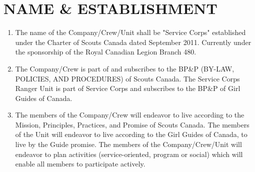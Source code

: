 \documentclass{Service_Corps_Document}
\begin{document}
    \def \Title {Constitution}
    \def \Company {Service Corps}
    \def \versionNumber {4.1}
    \stdFooter
    \begin{titlepage}
        \stdTitlePage
    \end{titlepage}

    \tableofcontents

    \newpage


    \section{NAME \& ESTABLISHMENT}\label{sec:name-&-establishment}
    \begin{enumerate}
        \item The name of the Company/Crew/Unit shall be "Service Corps" established under the Charter of Scouts Canada dated September 2011.
        Currently under the sponsorship of the Royal Canadian Legion Branch 480.
        \item The Company/Crew is part of and subscribes to the BP\&P (BY-LAW, POLICIES, AND PROCEDURES) of Scouts Canada.
        The Service Corps Ranger Unit is part of Service Corps and subscribes to the BP\&P of Girl Guides of Canada.
        \item The members of the Company/Crew will endeavor to live according to the Mission, Principles, Practices, and Promise of Scouts Canada.
        The members of the Unit will endeavor to live according to the Girl Guides of Canada, to live by the Guide promise.
        The members of the Company/Crew/Unit will endeavor to plan activities (service-oriented, program or social) which will enable all members to participate actively.
    \end{enumerate}
\end{document}
